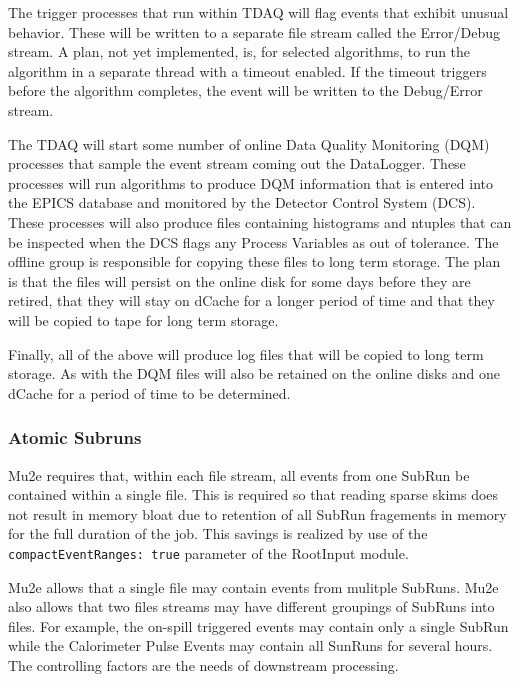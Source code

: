 The trigger processes that run within TDAQ will flag events that exhibit unusual behavior.  These will be written to a separate file stream called the Error/Debug stream.  A plan, not yet implemented, is, for selected algorithms, to run the algorithm in a separate thread with a timeout enabled.  If the timeout triggers before the algorithm completes, the event will be written to the Debug/Error stream.

The TDAQ will start some number of online Data Quality Monitoring (DQM) processes that sample the event stream coming out the DataLogger.  These processes will run algorithms to produce DQM information that is entered into the EPICS database and monitored by the Detector Control System (DCS).  These processes will also produce files containing histograms and ntuples that can be inspected when the DCS flags any Process Variables as out of tolerance.  The offline group is responsible for copying these files to long term storage.  The plan is that the files will persist on the online disk for some days before they are retired, that they will stay on dCache for a longer period of time and that they will be copied to tape for long term storage.

Finally, all of the above will produce log files that will be copied to long term storage.  As with the DQM files will also be retained on the online disks and one dCache for a period of time to be determined.

\subsubsection{Atomic Subruns}
\label{ssec:atomicSubruns}

Mu2e requires that, within each file stream, all events from one SubRun be contained within a single file.  This is required so that reading sparse skims does not result in memory bloat due to retention of all SubRun fragements in memory for the full duration of the job. This savings is realized by use of the {\tt compactEventRanges: true} parameter of the \art RootInput module.

Mu2e allows that a single file may contain events from mulitple SubRuns.   Mu2e also allows that two files streams may have different groupings of SubRuns into files. For example, the on-spill triggered events may contain only a single SubRun while the Calorimeter Pulse Events may contain all SunRuns for several hours. The controlling factors are the needs of downstream processing.

